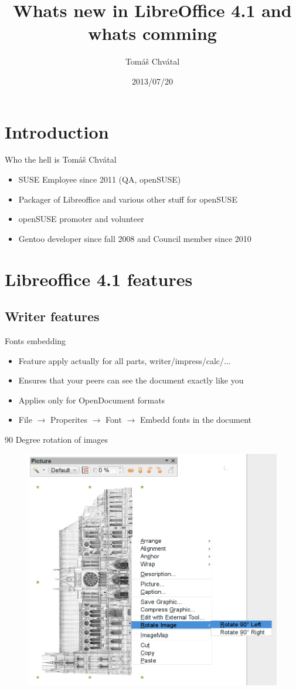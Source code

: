 \documentclass{beamer}
\author{Tom\'{a}\v{s} Chv\'{a}tal\newline {\small openSUSE Team}}
\title{Whats new in LibreOffice 4.1 and whats comming}
\date{2013/07/20}
\begin{document}
\begin{frame}[t,plain]
\titlepage
\end{frame}

\section{Introduction}

\begin{frame}[t]{Who the hell is Tomáš Chvátal}
	\begin{itemize}
	\item SUSE Employee since 2011 (QA, openSUSE)
	\item Packager of Libreoffice and various other stuff for openSUSE
	\item openSUSE promoter and volunteer
	\item Gentoo developer since fall 2008 and Council member since 2010
	\end{itemize}
\end{frame}

\section{Libreoffice 4.1 features}

\subsection{Writer features}

\begin{frame}[t]{Fonts embedding}
	\begin{itemize}
	\item Feature apply actually for all parts, writer/impress/calc/...
	\item Ensures that your peers can see the document exactly like you
	\item Applies only for OpenDocument formats
	\item File $\rightarrow$ Properites $\rightarrow$ Font $\rightarrow$ Embedd fonts in the document
	\end{itemize}
\end{frame}

\begin{frame}{90 Degree rotation of images}
	\begin{figure}
	\includegraphics[width= 0.6\linewidth]{90degreerotation-writer.png}
	\end{figure}
\end{frame}
\end{document}
